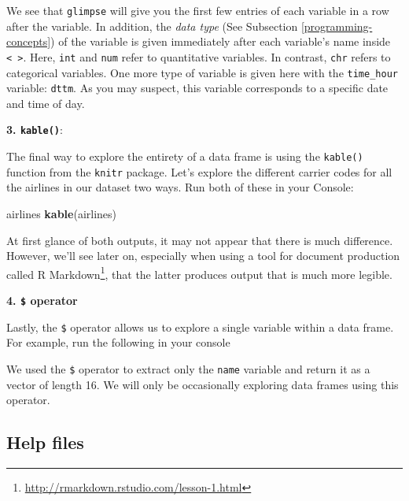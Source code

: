 \documentclass[12pt,]{krantz}
\makeatletter
\newenvironment{Shaded}{\begin{snugshade}}{\end{snugshade}}
\newcommand{\KeywordTok}[1]{\textcolor[rgb]{0.27,0.27,0.27}{\textbf{#1}}}
\newcommand{\OperatorTok}[1]{\textcolor[rgb]{0.43,0.43,0.43}{\textbf{#1}}}
\newcommand{\NormalTok}[1]{#1}
\renewcommand{\href}[2]{#2\footnote{\url{#1}}}
\newenvironment{kframe}{%
\medskip{}
\setlength{\fboxsep}{.8em}
 \def\at@end@of@kframe{}%
 \ifinner\ifhmode%
  \def\at@end@of@kframe{\end{minipage}}%
  \begin{minipage}{\columnwidth}%
 \fi\fi%
 \def\FrameCommand##1{\hskip\@totalleftmargin \hskip-\fboxsep
 \colorbox{shadecolor}{##1}\hskip-\fboxsep
     \hskip-\linewidth \hskip-\@totalleftmargin \hskip\columnwidth}%
 \MakeFramed {\advance\hsize-\width
   \@totalleftmargin\z@ \linewidth\hsize
   \@setminipage}}%
 {\par\unskip\endMakeFramed%
 \at@end@of@kframe}
\renewenvironment{Shaded}{\begin{kframe}}{\end{kframe}}
\makeatother
\begin{document}
We see that \texttt{glimpse} will give you the first few entries of each
variable in a row after the variable. In addition, the \emph{data type}
(See Subsection \ref{programming-concepts}) of the variable is given
immediately after each variable's name inside
\texttt{\textless{}\ \textgreater{}}. Here, \texttt{int} and
\texttt{num} refer to quantitative variables. In contrast, \texttt{chr}
refers to categorical variables. One more type of variable is given here
with the \texttt{time\_hour} variable: \texttt{dttm}. As you may
suspect, this variable corresponds to a specific date and time of day.

\textbf{3. \texttt{kable()}}:

The final way to explore the entirety of a data frame is using the
\texttt{kable()} function from the \texttt{knitr} package. Let's explore
the different carrier codes for all the airlines in our dataset two
ways. Run both of these in your Console:

\begin{Shaded}
\begin{Highlighting}[]
\NormalTok{airlines}
\KeywordTok{kable}\NormalTok{(airlines)}
\end{Highlighting}
\end{Shaded}

At first glance of both outputs, it may not appear that there is much
difference. However, we'll see later on, especially when using a tool
for document production called
\href{http://rmarkdown.rstudio.com/lesson-1.html}{R Markdown}, that the
latter produces output that is much more legible.

\textbf{4. \texttt{\$} operator}

Lastly, the \texttt{\$} operator allows us to explore a single variable
within a data frame. For example, run the following in your console

\begin{Shaded}
\end{Shaded}

We used the \texttt{\$} operator to extract only the \texttt{name}
variable and return it as a vector of length 16. We will only be
occasionally exploring data frames using this operator.

\subsection{Help files}\label{help-files}
\end{document}

